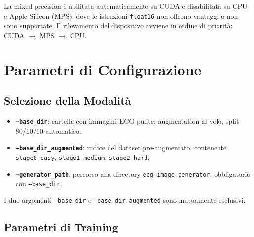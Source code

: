La mixed precision è abilitata automaticamente su CUDA e disabilitata su CPU e Apple Silicon (MPS), dove le istruzioni \texttt{float16} non offrono vantaggi o non sono supportate. Il rilevamento del dispositivo avviene in ordine di priorità: CUDA $\to$ MPS $\to$ CPU.

\section{Parametri di Configurazione}

\subsection{Selezione della Modalità}

\begin{itemize}
    \item \textbf{\texttt{--base\_dir}}: cartella con immagini ECG pulite; augmentation al volo, split 80/10/10 automatico.
    \item \textbf{\texttt{--base\_dir\_augmented}}: radice del dataset pre-augmentato, contenente \texttt{stage0\_easy}, \texttt{stage1\_medium}, \texttt{stage2\_hard}.
    \item \textbf{\texttt{--generator\_path}}: percorso alla directory \texttt{ecg-image-generator}; obbligatorio con \texttt{--base\_dir}.
\end{itemize}

I due argomenti \texttt{--base\_dir} e \texttt{--base\_dir\_augmented} sono mutuamente esclusivi.

\subsection{Parametri di Training}

